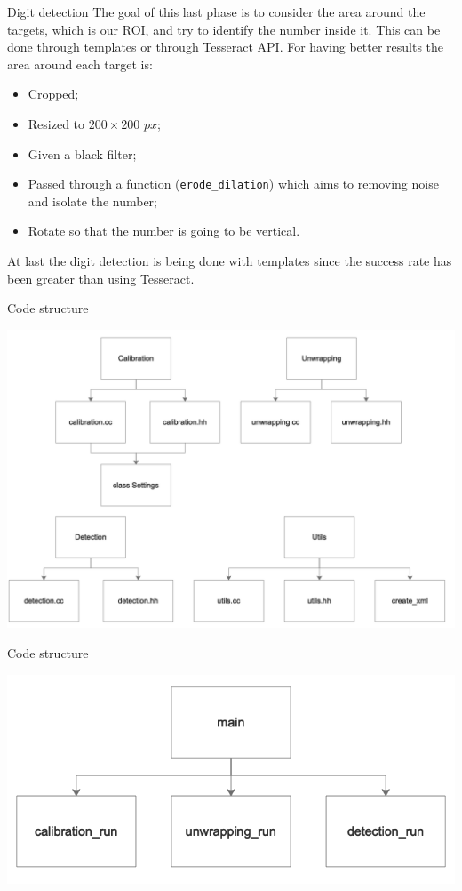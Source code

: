 \begin{frame}[fragile]{Digit detection}
The goal of this last phase is to consider the area around the targets, which is our ROI, and try to identify the number inside it. \newline
This can be done through templates or through Tesseract API. 
For having better results the area around each target is:
\begin{itemize}
	\item Cropped;
	\item Resized to $200\times 200$ $px$;
	\item Given a black filter;
	\item Passed through a function (\texttt{erode_dilation}) which aims to removing noise and isolate the number;
	\item Rotate so that the number is going to be vertical.
\end{itemize}
At last the digit detection is being done with templates since the success rate has been greater than using Tesseract. 
\end{frame}

\begin{frame}{Code structure}
	\begin{center}
		\includegraphics[scale=0.45]{Immagini/Code1}
	\end{center}
\end{frame}

\begin{frame}{Code structure}
	\begin{center}
		\includegraphics[scale=0.7]{Immagini/Code2}
	\end{center}
\end{frame}

